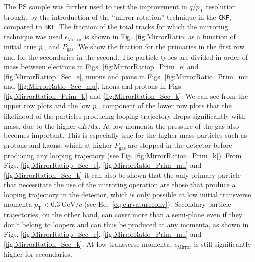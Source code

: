 The PS sample was further used to test the improvement in $q/p_{\text{T}}$ resolution brought by the introduction of the \enquote{mirror rotation} technique in the \texttt{CKF}, compared to \texttt{BKF}. The fraction of the total tracks for which the mirroring technique was used $\epsilon_\textrm{Mirror}$ is shown in Fig.~\ref{fig:MirrorRatio} as a function of initial true $p_\textrm{T}$ and $P_\textrm{gas}$. We show the fraction for the primaries in the first row and for the secondaries in the second. The particle types are divided in order of mass between electrons in Figs. \ref{fig:MirrorRatiop_Prim_e} and \ref{fig:MirrorRatiop_Sec_e}, muons and pions in Figs. \ref{fig:MirrorRatio_Prim_mu} and \ref{fig:MirrorRatio_Sec_mu}, kaons and protons in Figs. \ref{fig:MirrorRation_Prim_k} and \ref{fig:MirrorRation_Sec_k}. We can see from the upper row plots and the low $p_\textrm{T}$ component of the lower row plots that the likelihood of the particles producing looping trajectory drops significantly with mass, due to the higher $\textrm{d}E/\textrm{d}x$. At low momenta the pressure of the gas also becomes important. This is especially true for the higher mass particles such as protons and kaons, which at higher $P_\textrm{gas}$ are stopped in the detector before producing any looping trajectory (see Fig. \ref{fig:MirrorRation_Prim_k}). From Figs. \ref{fig:MirrorRatiop_Sec_e}, \ref{fig:MirrorRatio_Prim_mu} and \ref{fig:MirrorRation_Sec_k} it can also be shown that the only primary particle that necessitate the use of the mirroring operation are those that produce a looping trajectory in the detector, which is only possible at low initial transverse momenta $p_\textrm{T}<0.3 \ \textrm{GeV}/c$ (see Eq.~\ref{eq:curvatureconv}).  Secondary particle trajectories, on the other hand, can cover more than a semi-plane even if they don't belong to loopers and can thus be produced at any momenta, as shown in Figs. \ref{fig:MirrorRatiop_Sec_e}, \ref{fig:MirrorRatio_Prim_mu} and \ref{fig:MirrorRation_Sec_k}. At low transverse momenta, $\epsilon_\textrm{Mirror}$ is still significantly higher for secondaries. 

